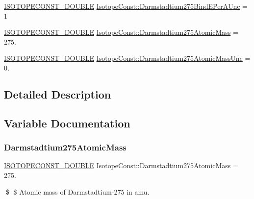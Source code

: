 \begin{DoxyCompactItemize}
\item 
\mbox{\hyperlink{group___isotope_const-_macros_ga8f45a7272ce02c0b4c65c44636ed719a}{I\+S\+O\+T\+O\+P\+E\+C\+O\+N\+S\+T\+\_\+\+D\+O\+U\+B\+LE}} \mbox{\hyperlink{group___isotope_const-_darmstadtium-_ds275_gafb3b9e666cfb82a474b514bbc9efb482}{Isotope\+Const\+::\+Darmstadtium275\+Bind\+E\+Per\+A\+Unc}} = 1
\item 
\mbox{\hyperlink{group___isotope_const-_macros_ga8f45a7272ce02c0b4c65c44636ed719a}{I\+S\+O\+T\+O\+P\+E\+C\+O\+N\+S\+T\+\_\+\+D\+O\+U\+B\+LE}} \mbox{\hyperlink{group___isotope_const-_darmstadtium-_ds275_gabc9e5fa5b2bf42982be3e8fdfcf87dfc}{Isotope\+Const\+::\+Darmstadtium275\+Atomic\+Mass}} = 275.
\item 
\mbox{\hyperlink{group___isotope_const-_macros_ga8f45a7272ce02c0b4c65c44636ed719a}{I\+S\+O\+T\+O\+P\+E\+C\+O\+N\+S\+T\+\_\+\+D\+O\+U\+B\+LE}} \mbox{\hyperlink{group___isotope_const-_darmstadtium-_ds275_ga9dae2251054306c1959af1a5b5e8af1f}{Isotope\+Const\+::\+Darmstadtium275\+Atomic\+Mass\+Unc}} = 0.
\end{DoxyCompactItemize}


\subsection{Detailed Description}


\subsection{Variable Documentation}
\mbox{\label{group___isotope_const-_darmstadtium-_ds275_gabc9e5fa5b2bf42982be3e8fdfcf87dfc}} 
\subsubsection{\texorpdfstring{Darmstadtium275\+Atomic\+Mass}{Darmstadtium275AtomicMass}}
{\footnotesize\ttfamily \mbox{\hyperlink{group___isotope_const-_macros_ga8f45a7272ce02c0b4c65c44636ed719a}{I\+S\+O\+T\+O\+P\+E\+C\+O\+N\+S\+T\+\_\+\+D\+O\+U\+B\+LE}} Isotope\+Const\+::\+Darmstadtium275\+Atomic\+Mass = 275.}

\$ \$ Atomic mass of Darmstadtium-\/275 in amu. \mbox{\label{group___isotope_const-_darmstadtium-_ds275_ga9dae2251054306c1959af1a5b5e8af1f}} 
